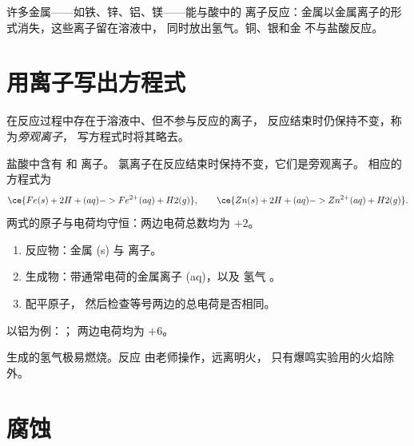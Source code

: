 \begin{proposition}[金属与酸的反应]\label{prop:g9:metals-acids-corrosion:acid}
许多金属——如铁、锌、铝、镁——能与酸中的
 离子反应：金属以金属离子的形式消失，这些离子留在溶液中，
同时放出氢气。铜、银和金
不与盐酸反应。
\end{proposition}

\section{用离子写出方程式}

\begin{definition}[旁观离子]\label{def:g9:metals-acids-corrosion:spectator}
在反应过程中存在于溶液中、但不参与反应的离子，
反应结束时仍保持不变，称为\emph{旁观离子}，
写方程式时将其略去。
\end{definition}

\begin{example}[铁和锌与盐酸的反应]\label{ex:g9:metals-acids-corrosion:iron}
盐酸中含有  和  离子。
氯离子在反应结束时保持不变，它们是旁观离子。
相应的方程式为
\[
  \ce{Fe(s) + 2H+(aq) -> Fe^{2+}(aq) + H2(g)}, \qquad
  \ce{Zn(s) + 2H+(aq) -> Zn^{2+}(aq) + H2(g)}.
\]
两式的原子与电荷均守恒：两边电荷总数均为 $+2$。
\end{example}

\begin{method}[写出金属与酸反应的方程式]\label{met:g9:metals-acids-corrosion:write}
\begin{enumerate}
  \item 反应物：金属 (s) 与  离子。
  \item 生成物：带通常电荷的金属离子 (aq)，以及
        氢气 。
  \item 配平原子，
        然后检查等号两边的总电荷是否相同。
\end{enumerate}
以铝为例：；
两边电荷均为 $+6$。
\end{method}

\begin{safety}{}
生成的氢气极易燃烧。反应
由老师操作，远离明火，
只有爆鸣实验用的火焰除外。
\end{safety}

\section{腐蚀}

